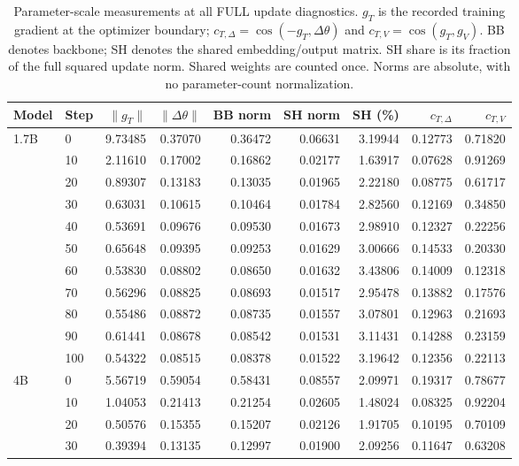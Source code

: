 \begin{table}[!htbp]
\centering
\caption{Parameter-scale measurements at all FULL update diagnostics. $g_T$ is the recorded training gradient at the optimizer boundary; $c_{T,\Delta}=\cos(-g_T,\Delta\theta)$ and $c_{T,V}=\cos(g_T,g_V)$. BB denotes backbone; SH denotes the shared embedding/output matrix. SH share is its fraction of the full squared update norm. Shared weights are counted once. Norms are absolute, with no parameter-count normalization.}
\label{tab:parameter_update_groups}
\small\setlength{\tabcolsep}{5pt}
\begin{tabular}{llrrrrrrr}
\toprule
Model & Step & $\|g_T\|$ & $\|\Delta\theta\|$ & BB norm & SH norm & SH (\%) & $c_{T,\Delta}$ & $c_{T,V}$ \\
\midrule
\multirow{11}{*}{1.7B} & 0 & 9.73485 & 0.37070 & 0.36472 & 0.06631 & 3.19944 & 0.12773 & 0.71820 \\
 & 10 & 2.11610 & 0.17002 & 0.16862 & 0.02177 & 1.63917 & 0.07628 & 0.91269 \\
 & 20 & 0.89307 & 0.13183 & 0.13035 & 0.01965 & 2.22180 & 0.08775 & 0.61717 \\
 & 30 & 0.63031 & 0.10615 & 0.10464 & 0.01784 & 2.82560 & 0.12169 & 0.34850 \\
 & 40 & 0.53691 & 0.09676 & 0.09530 & 0.01673 & 2.98910 & 0.12327 & 0.22256 \\
 & 50 & 0.65648 & 0.09395 & 0.09253 & 0.01629 & 3.00666 & 0.14533 & 0.20330 \\
 & 60 & 0.53830 & 0.08802 & 0.08650 & 0.01632 & 3.43806 & 0.14009 & 0.12318 \\
 & 70 & 0.56296 & 0.08825 & 0.08693 & 0.01517 & 2.95478 & 0.13882 & 0.17576 \\
 & 80 & 0.55486 & 0.08872 & 0.08735 & 0.01557 & 3.07801 & 0.12963 & 0.21693 \\
 & 90 & 0.61441 & 0.08678 & 0.08542 & 0.01531 & 3.11431 & 0.14288 & 0.23159 \\
 & 100 & 0.54322 & 0.08515 & 0.08378 & 0.01522 & 3.19642 & 0.12356 & 0.22113 \\
\midrule
\multirow{11}{*}{4B} & 0 & 5.56719 & 0.59054 & 0.58431 & 0.08557 & 2.09971 & 0.19317 & 0.78677 \\
 & 10 & 1.04053 & 0.21413 & 0.21254 & 0.02605 & 1.48024 & 0.08325 & 0.92204 \\
 & 20 & 0.50576 & 0.15355 & 0.15207 & 0.02126 & 1.91705 & 0.10195 & 0.70109 \\
 & 30 & 0.39394 & 0.13135 & 0.12997 & 0.01900 & 2.09256 & 0.11647 & 0.63208 \\

\end{tabular}
\end{table}
